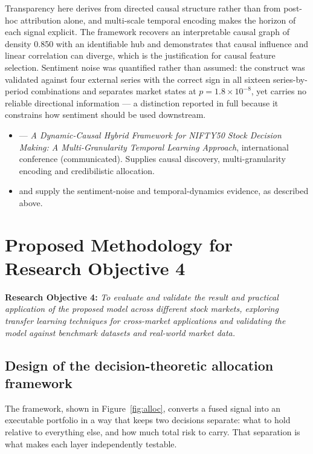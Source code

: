 Transparency here derives from directed causal structure rather than from post-hoc
attribution alone, and multi-scale temporal encoding makes the horizon of each signal
explicit. The framework recovers an interpretable causal graph of density 0.850 with an
identifiable hub and demonstrates that causal influence and linear correlation can
diverge, which is the justification for causal feature selection. Sentiment noise was
quantified rather than assumed: the construct was validated against four external series
with the correct sign in all sixteen series-by-period combinations and separates market
states at $p = 1.8 \times 10^{-8}$, yet carries no reliable directional information --- a
distinction reported in full because it constrains how sentiment should be used
downstream.

\begin{itemize}
\item {} --- \emph{A Dynamic-Causal Hybrid Framework for NIFTY50 Stock Decision
Making: A Multi-Granularity Temporal Learning Approach}, international conference
(communicated). Supplies causal discovery, multi-granularity encoding and credibilistic
allocation.
\item {} and  supply the sentiment-noise and temporal-dynamics
evidence, as described above.
\end{itemize}

\section{Proposed Methodology for Research Objective 4}

\textbf{Research Objective 4:} \emph{To evaluate and validate the result and practical
application of the proposed model across different stock markets, exploring transfer
learning techniques for cross-market applications and validating the model against
benchmark datasets and real-world market data.}

\subsection{Design of the decision-theoretic allocation framework}

The framework, shown in Figure~\ref{fig:alloc}, converts a fused signal into an
executable portfolio in a way that keeps two decisions separate: what to hold relative to
everything else, and how much total risk to carry. That separation is what makes each
layer independently testable.

